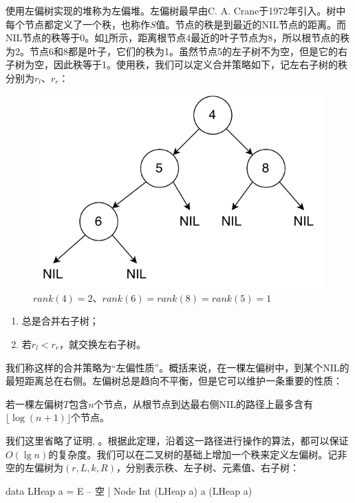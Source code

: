 \documentclass[b5paper]{ctexart}
\begin{document}
使用左偏树实现的堆称为左偏堆。左偏树最早由C. A. Crane于1972年引入\cite{wiki-leftist-tree}。树中每个节点都定义了一个秩，也称作$S$值。节点的秩是到最近的NIL节点的距离。而NIL节点的秩等于0。如\cref{fig:rank}所示，距离根节点4最近的叶子节点为8，所以根节点的秩为2。节点6和8都是叶子，它们的秩为1。虽然节点5的左子树不为空，但是它的右子树为空，因此秩等于1。使用秩，我们可以定义合并策略如下，记左右子树的秩分别为$r_l$、$r_r$：

\begin{figure}[htbp]
  \centering
  \includegraphics[scale=0.45]{img/rank}
  \caption{$rank(4) = 2$、$rank(6) = rank(8) = rank(5) = 1$}
  \label{fig:rank}
\end{figure}

\begin{enumerate}
\item 总是合并右子树；
\item 若$r_l < r_r$，就交换左右子树。
\end{enumerate}

我们称这样的合并策略为“左偏性质”。概括来说，在一棵左偏树中，到某个NIL的最短距离总在右侧。左偏树总是趋向不平衡，但是它可以维护一条重要的性质：

\begin{theorem}
若一棵左偏树$T$包含$n$个节点，从根节点到达最右侧NIL的路径上最多含有$\lfloor \log (n + 1) \rfloor$个节点。
\end{theorem}

我们这里省略了证明\cite{brono-book}, \cite{TAOCP-bheap}。根据此定理，沿着这一路径进行操作的算法，都可以保证$O(\lg n)$的复杂度。我们可以在二叉树的基础上增加一个秩来定义左偏树。记非空的左偏树为$(r, L, k, R)$，分别表示秩、左子树、元素值、右子树：

\lstset{frame = single}
\begin{Haskell}
data LHeap a = E -- 空
             | Node Int (LHeap a) a (LHeap a)
\end{Haskell}
\end{document}
